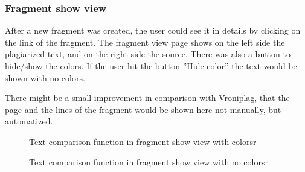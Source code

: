 \subsubsection{Fragment show view }

After a new fragment was created, the user could see it in details by clicking on the link of the fragment. The fragment view page shows on the left side the plagiarized text, and on the right side the source. There was also a button to hide/show the colors. If the user hit the button ''Hide color'' the text would be shown with no colors.

There might be a small improvement in comparison with Vroniplag, that the page and the lines of the fragment would be shown here not manually, but automatized.

\begin{figure}[!h]
  \centering
  \caption{Text comparison function in fragment show view with colorsr}
  \label{fig:cropping-avatar}
\end{figure}

\begin{figure}[!h]
  \centering
  \caption{Text comparison function in fragment show view with no colorsr}
  \label{fig:cropping-avatar}
\end{figure}